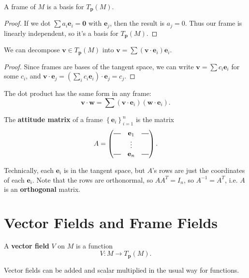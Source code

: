 \documentclass[10pt]{report}
\begin{document}
\begin{prop}
	A frame of $M$ is a basis for $T_{\mathbf{p}}(M)$.
\end{prop}
\begin{proof}
	If we dot $\sum a_i \mathbf{e}_i =\mathbf{0}$ with $\mathbf{e}_j$, then the result is $a_j=0$. Thus our frame is linearly independent, so it's a basis for $T_{\mathbf{p}}(M)$.
\end{proof}

\begin{prop}
	We can decompose $\mathbf{v} \in T_{\mathbf{p}}(M)$ into $\mathbf{v} = \sum (\mathbf{v}\cdot \mathbf{e}_i)\mathbf{e}_i$.
\end{prop}
\begin{proof}
	Since frames are bases of the tangent space, we can write $\mathbf{v} = \sum c_i \mathbf{e}_i$ for some $c_i$, and $\mathbf{v}\cdot \mathbf{e}_j = (\sum_i c_i \mathbf{e}_i)\cdot \mathbf{e}_j = c_j$.
\end{proof}

The dot product has the same form in any frame:
\[
	\mathbf{v}\cdot \mathbf{w} = \sum (\mathbf{v}\cdot\mathbf{e}_i)(\mathbf{w}\cdot\mathbf{e}_i).
\] 

\begin{defn}[]
The \textbf{attitude matrix} of a frame $\left\{ \mathbf{e}_i \right\}_{i=1}^n$ is the matrix
\[
	A=
\begin{pmatrix}
	\rule[.5ex]{2.5ex}{0.5pt} & \mathbf{e}_1 & \rule[.5ex]{2.5ex}{0.5pt} \\
				  & \vdots & \\
	\rule[.5ex]{2.5ex}{0.5pt} & \mathbf{e}_n & \rule[.5ex]{2.5ex}{0.5pt}
\end{pmatrix}.
\] 
\end{defn}

Technically, each $\mathbf{e}_i$ is in the tangent space, but $A$'s rows are just the coordinates of each $\mathbf{e}_i$. Note that the rows are orthonormal, so $A A^T = I_n$, so $A^{-1}=A^T$, i.e. $A$ is an \textbf{orthogonal} matrix.


\section{Vector Fields and Frame Fields}

\begin{defn}
	A \textbf{vector field} $V$ on $M$ is a function
	\[
		V:M \to T_{\mathbf{p}}(M).
	\] 
\end{defn}
Vector fields can be added and scalar multiplied in the usual way for functions.
\end{document}
